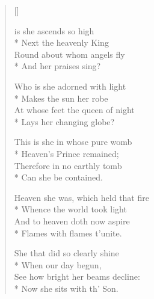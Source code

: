 
\newHymn

\begin{verse}[\versewidth]
\begin{altverse}
 is she ascends so high\\*
Next the heavenly King\\
Round about whom angels fly\\*
And her praises sing?
\end{altverse}

\begin{altverse}
Who is she adorned with light\\*
Makes the sun her robe\\
At whose feet the queen of night\\*
Lays her changing globe?
\end{altverse}

\begin{altverse}
This is she in whose pure womb\\*
Heaven's Prince remained;\\
Therefore in no earthly tomb\\*
Can she be contained.
\end{altverse}

\begin{altverse}
Heaven she was, which held that fire\\*
Whence the world took light\\
And to heaven doth now aspire\\*
Flames with flames t'unite.
\end{altverse}

\begin{altverse}
She that did so clearly shine\\*
When our day begun,\\
See how bright her beams decline:\\*
Now she sits with th' Son.
\end{altverse}


\end{verse}


